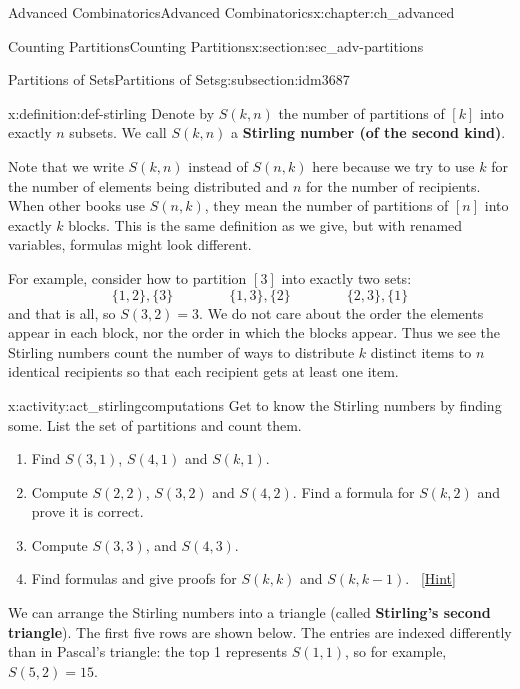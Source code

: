 \documentclass[oneside,10pt,]{book}
\newcommand{\terminology}[1]{\textbf{#1}}
\numberwithin{equation}{chapter}
\begin{document}
\begin{chapterptx}{Advanced Combinatorics}{}{Advanced Combinatorics}{}{}{x:chapter:ch_advanced}
\begin{sectionptx}{Counting Partitions}{}{Counting Partitions}{}{}{x:section:sec_adv-partitions}
\begin{subsectionptx}{Partitions of Sets}{}{Partitions of Sets}{}{}{g:subsection:idm3687}
\begin{definition}{}{x:definition:def-stirling}%
Denote by \(S(k,n)\) the number of partitions of \([k]\) into exactly \(n\) subsets.  We call \(S(k,n)\) a \terminology{Stirling number (of the second kind)}.%
\end{definition}
Note that we write \(S(k,n)\) instead of \(S(n,k)\) here because we try to use \(k\) for the number of elements being distributed and \(n\) for the number of recipients.  When other books use \(S(n,k)\), they mean the number of partitions of \([n]\) into exactly \(k\) blocks.  This is the same definition as we give, but with renamed variables, formulas might look different.%
\par
For example, consider how to partition \([3]\) into exactly two sets:%
\begin{equation*}
\{1,2\}, \{3\} \qquad \qquad \{1,3\},\{2\} \qquad \qquad \{2,3\},\{1\}
\end{equation*}
and that is all, so \(S(3,2) = 3\).  We do not care about the order the elements appear in each block, nor the order in which the blocks appear.  Thus we see the Stirling numbers count the number of ways to distribute \(k\) distinct items to \(n\) identical recipients so that each recipient gets at least one item.%
\begin{activity}{}{x:activity:act_stirlingcomputations}%
Get to know the Stirling numbers by finding some.  List the set of partitions and count them.%
\begin{enumerate}[font=\bfseries,label=(\alph*),ref=\alph*]
\item{}Find \(S(3,1)\), \(S(4,1)\) and \(S(k,1)\).%
\item{}Compute \(S(2,2)\), \(S(3,2)\) and \(S(4,2)\).  Find a formula for \(S(k,2)\) and prove it is correct.%
\item{}Compute \(S(3,3)\), and \(S(4,3)\).%
\item{}Find formulas and give proofs for \(S(k,k)\) and \(S(k,k - 1)\).%
\qquad~\hfill{\tiny\hyperlink{g:hint:idm3743-back}{[Hint]}}\end{enumerate}
\end{activity}
We can arrange the Stirling numbers into a triangle (called \terminology{Stirling's second triangle}).  The first five rows are shown below.  The entries are indexed differently than in Pascal's triangle: the top 1 represents \(S(1,1)\), so for example, \(S(5,2) = 15\).%
\begin{sidebyside}{1}{0.25}{0.25}{0}%
\begin{sbspanel}{0.5}%

\end{sbspanel}
\end{sidebyside}
\end{subsectionptx}
\end{sectionptx}
\end{chapterptx}
\end{document}
